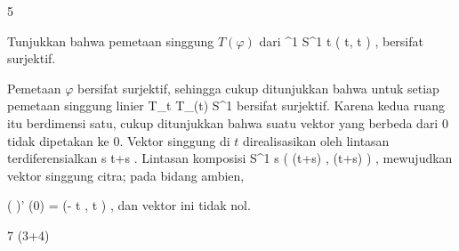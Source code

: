 {5}

{

Tunjukkan bahwa pemetaan singgung $T(\varphi)$ dari
\maabbeledisp {\varphi} {\R^1} {S^1
} { t } {( \cos  t, \sin  t  )
} {,}
bersifat surjektif.

}
{

Pemetaan $\varphi$ bersifat surjektif, sehingga cukup ditunjukkan bahwa untuk setiap
 pemetaan singgung linier
\maabbdisp {} {T_t \R \cong \R} { T_{\varphi(t)} S^1
} {}
bersifat surjektif. Karena kedua ruang itu berdimensi satu, cukup ditunjukkan bahwa suatu vektor yang berbeda dari $0$ tidak dipetakan ke $0$. Vektor singgung di $t$ direalisasikan oleh lintasan terdiferensialkan
\maabbeledisp {\gamma} {\R} {\R
} { s } {t+s
} {.}
Lintasan komposisi
\maabbeledisp {\varphi \circ \gamma} {\R} {S^1
} { s } { ( \cos (t+s) , \sin (t+s) )
} {,}
mewujudkan vektor singgung citra; pada bidang ambien,
 {} {}

\mavergleichskettedisp
{\vergleichskette
{( \varphi \circ \gamma)' (0)
}
{ =} {(- \sin t , \cos t )
}
{ } {
}
{ } {
}
{ } {
}
}
{}{}{,}
dan vektor ini tidak nol.

 }



{7 (3+4)}

